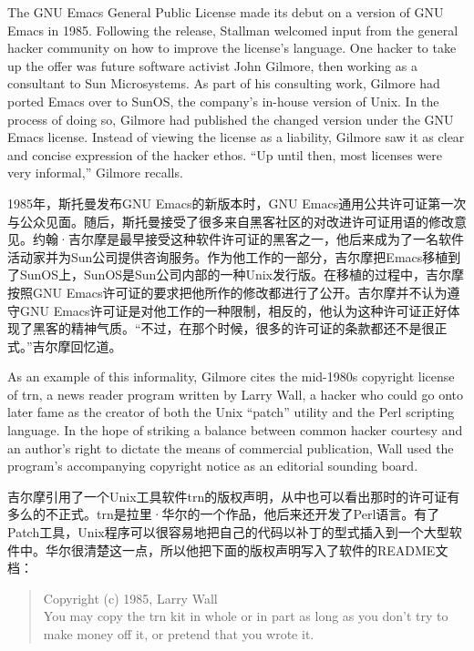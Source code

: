 \ifdefined\eng
The GNU Emacs General Public License made its debut on a version of GNU Emacs in 1985. Following the release, Stallman welcomed input from the general hacker community on how to improve the license's language. One hacker to take up the offer was future software activist John Gilmore, then working as a consultant to Sun Microsystems. As part of his consulting work, Gilmore had ported Emacs over to SunOS, the company's in-house version of Unix. In the process of doing so, Gilmore had published the changed version under the GNU Emacs license. Instead of viewing the license as a liability, Gilmore saw it as clear and concise expression of the hacker ethos. ``Up until then, most licenses were very informal,'' Gilmore recalls.
\fi

\ifdefined\chs
1985年，斯托曼发布GNU Emacs的新版本时，GNU Emacs通用公共许可证第一次与公众见面。随后，斯托曼接受了很多来自黑客社区的对改进许可证用语的修改意见。约翰·吉尔摩是最早接受这种软件许可证的黑客之一，他后来成为了一名软件活动家并为Sun公司提供咨询服务。作为他工作的一部分，吉尔摩把Emacs移植到了SunOS上，SunOS是Sun公司内部的一种Unix发行版。在移植的过程中，吉尔摩按照GNU Emacs许可证的要求把他所作的修改都进行了公开。吉尔摩并不认为遵守GNU Emacs许可证是对他工作的一种限制，相反的，他认为这种许可证正好体现了黑客的精神气质。“不过，在那个时候，很多的许可证的条款都还不是很正式。”吉尔摩回忆道。
\fi

\ifdefined\eng
As an example of this informality, Gilmore cites the mid-1980s copyright license of trn, a news reader program written by Larry Wall, a hacker who could go onto later fame as the creator of both the Unix ``patch'' utility and the Perl scripting language. In the hope of striking a balance between common hacker courtesy and an author's right to dictate the means of commercial publication, Wall used the program's accompanying copyright notice as an editorial sounding board.
\fi

\ifdefined\chs
吉尔摩引用了一个Unix工具软件trn的版权声明，从中也可以看出那时的许可证有多么的不正式。trn是拉里·华尔的一个作品，他后来还开发了Perl语言。有了Patch工具，Unix程序可以很容易地把自己的代码以补丁的型式插入到一个大型软件中。华尔很清楚这一点，所以他把下面的版权声明写入了软件的README文档：
\fi

\ifdefined\eng
\begin{quote}
Copyright (c) 1985, Larry Wall\\
You may copy the trn kit in whole or in part as long as you don't try to make money off it, or pretend that you wrote it.
\end{quote}
\fi

